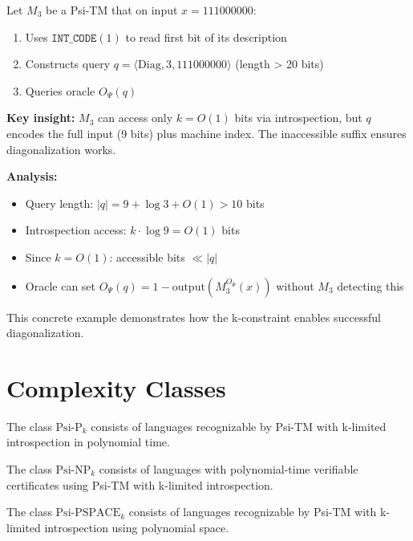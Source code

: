 \documentclass[11pt]{article}
\begin{document}
\begin{example}
\label{ex:concrete-diagonalization}
Let $M_3$ be a Psi-TM that on input $x = 111000000$:
\begin{enumerate}
\item Uses $\texttt{INT\_CODE}(1)$ to read first bit of its description
\item Constructs query $q = \langle \text{Diag}, 3, 111000000 \rangle$ (length > 20 bits)
\item Queries oracle $O_\Psi(q)$
\end{enumerate}

\textbf{Key insight:} $M_3$ can access only $k=O(1)$ bits via introspection, but $q$ encodes the full input (9 bits) plus machine index. The inaccessible suffix ensures diagonalization works.

\textbf{Analysis:}
\begin{itemize}
\item Query length: $|q| = 9 + \log 3 + O(1) > 10$ bits
\item Introspection access: $k \cdot \log 9 = O(1)$ bits
\item Since $k = O(1)$: accessible bits $\ll |q|$
\item Oracle can set $O_\Psi(q) = 1 - \text{output}(M_3^{O_\Psi}(x))$ without $M_3$ detecting this
\end{itemize}

This concrete example demonstrates how the k-constraint enables successful diagonalization.
\end{example}

\section{Complexity Classes}

\begin{definition}
The class $\text{Psi-P}_k$ consists of languages recognizable by Psi-TM with k-limited introspection in polynomial time.
\end{definition}

\begin{definition}
The class $\text{Psi-NP}_k$ consists of languages with polynomial-time verifiable certificates using Psi-TM with k-limited introspection.
\end{definition}

\begin{definition}
The class $\text{Psi-PSPACE}_k$ consists of languages recognizable by Psi-TM with k-limited introspection using polynomial space.
\end{definition}
\end{document}
